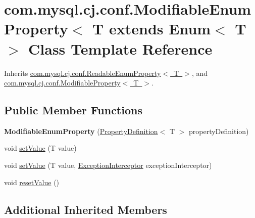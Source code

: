 \hypertarget{classcom_1_1mysql_1_1cj_1_1conf_1_1_modifiable_enum_property}{}\section{com.\+mysql.\+cj.\+conf.\+Modifiable\+Enum\+Property$<$ T extends Enum$<$ T $>$ Class Template Reference}
\label{classcom_1_1mysql_1_1cj_1_1conf_1_1_modifiable_enum_property}


Inherits \mbox{\hyperlink{classcom_1_1mysql_1_1cj_1_1conf_1_1_readable_enum_property}{com.\+mysql.\+cj.\+conf.\+Readable\+Enum\+Property$<$ T $>$}}, and \mbox{\hyperlink{interfacecom_1_1mysql_1_1cj_1_1conf_1_1_modifiable_property}{com.\+mysql.\+cj.\+conf.\+Modifiable\+Property$<$ T $>$}}.

\subsection*{Public Member Functions}
\begin{DoxyCompactItemize}
\item 
\mbox{\label{classcom_1_1mysql_1_1cj_1_1conf_1_1_modifiable_enum_property_a405f1712974b98406893ec3292cb2dd0}} 
{\bfseries Modifiable\+Enum\+Property} (\mbox{\hyperlink{interfacecom_1_1mysql_1_1cj_1_1conf_1_1_property_definition}{Property\+Definition}}$<$ T $>$ property\+Definition)
\item 
void \mbox{\hyperlink{classcom_1_1mysql_1_1cj_1_1conf_1_1_modifiable_enum_property_a75933d467e8ce6bf8da46c21e3177e0f}{set\+Value}} (T value)
\item 
void \mbox{\hyperlink{classcom_1_1mysql_1_1cj_1_1conf_1_1_modifiable_enum_property_aeb04443d10144806024e2a28bf4942de}{set\+Value}} (T value, \mbox{\hyperlink{interfacecom_1_1mysql_1_1cj_1_1exceptions_1_1_exception_interceptor}{Exception\+Interceptor}} exception\+Interceptor)
\item 
void \mbox{\hyperlink{classcom_1_1mysql_1_1cj_1_1conf_1_1_modifiable_enum_property_a45be76d841ee45583b59419fa45526f6}{reset\+Value}} ()
\end{DoxyCompactItemize}
\subsection*{Additional Inherited Members}


